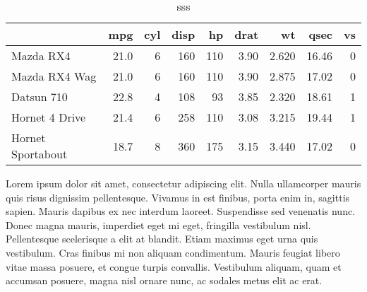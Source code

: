 \documentclass[]{article}
\newenvironment{Shaded}{\begin{snugshade}}{\end{snugshade}}
\newcommand{\KeywordTok}[1]{\textcolor[rgb]{0.13,0.29,0.53}{\textbf{{#1}}}}
\newcommand{\DataTypeTok}[1]{\textcolor[rgb]{0.13,0.29,0.53}{{#1}}}
\newcommand{\DecValTok}[1]{\textcolor[rgb]{0.00,0.00,0.81}{{#1}}}
\newcommand{\StringTok}[1]{\textcolor[rgb]{0.31,0.60,0.02}{{#1}}}
\newcommand{\NormalTok}[1]{{#1}}
\begin{document}
\begin{wraptable}{l}{12.45cm}

\caption{\label{tab:unnamed-chunk-5}sss}
\centering
\fontsize{6}{8}\selectfont
\begin{tabular}[t]{l|r|r|r|r|r|r|r|r}
\hline
  & mpg & cyl & disp & hp & drat & wt & qsec & vs\\
\hline
Mazda RX4 & 21.0 & 6 & 160 & 110 & 3.90 & 2.620 & 16.46 & 0\\
\hline
Mazda RX4 Wag & 21.0 & 6 & 160 & 110 & 3.90 & 2.875 & 17.02 & 0\\
\hline
Datsun 710 & 22.8 & 4 & 108 & 93 & 3.85 & 2.320 & 18.61 & 1\\
\hline
Hornet 4 Drive & 21.4 & 6 & 258 & 110 & 3.08 & 3.215 & 19.44 & 1\\
\hline
Hornet Sportabout & 18.7 & 8 & 360 & 175 & 3.15 & 3.440 & 17.02 & 0\\
\hline
\end{tabular}
\end{wraptable}


Lorem ipsum dolor sit amet, consectetur adipiscing elit. Nulla
ullamcorper mauris quis risus dignissim pellentesque. Vivamus in est
finibus, porta enim in, sagittis sapien. Mauris dapibus ex nec interdum
laoreet. Suspendisse sed venenatis nunc. Donec magna mauris, imperdiet
eget mi eget, fringilla vestibulum nisl. Pellentesque scelerisque a elit
at blandit. Etiam maximus eget urna quis vestibulum. Cras finibus mi non
aliquam condimentum. Mauris feugiat libero vitae massa posuere, et
congue turpis convallis. Vestibulum aliquam, quam et accumsan posuere,
magna nisl ornare nunc, ac sodales metus elit ac erat.

\begin{Shaded}
\end{Shaded}

\end{document}
